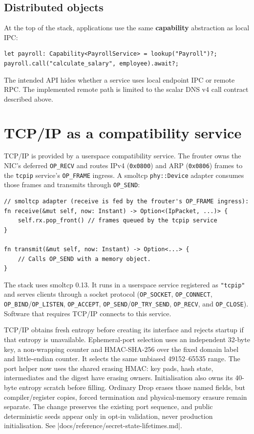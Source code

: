 \subsection{Distributed objects}

At the top of the stack, applications use the same \textbf{capability}
abstraction as local IPC:

\begin{lstlisting}[style=rustCode]
let payroll: Capability<PayrollService> = lookup("Payroll")?;
payroll.call("calculate_salary", employee).await?;
\end{lstlisting}

The intended API hides whether a service uses local endpoint IPC or remote RPC.
The implemented remote path is limited to the scalar DNS v4 call contract
described above.

\section{TCP/IP as a compatibility service}

TCP/IP is provided by a userspace compatibility service. The frouter owns the
NIC's deferred \texttt{OP\_RECV} and routes IPv4 (\texttt{0x0800}) and ARP
(\texttt{0x0806}) frames to the \texttt{tcpip} service's \texttt{OP\_FRAME}
ingress. A smoltcp \texttt{phy::Device} adapter consumes those frames and
transmits through \texttt{OP\_SEND}:

\begin{lstlisting}[style=rustCode]
// smoltcp adapter (receive is fed by the frouter's OP_FRAME ingress):
fn receive(&mut self, now: Instant) -> Option<(IpPacket, ...)> {
    self.rx.pop_front() // frames queued by the tcpip service
}

fn transmit(&mut self, now: Instant) -> Option<...> {
    // Calls OP_SEND with a memory object.
}
\end{lstlisting}

The stack uses smoltcp 0.13. It runs in a userspace service registered as
\texttt{"tcpip"} and serves clients through a socket protocol
(\texttt{OP\_SOCKET}, \texttt{OP\_CONNECT},
\texttt{OP\_BIND}/\texttt{OP\_LISTEN}, \texttt{OP\_ACCEPT}, \texttt{OP\_SEND}/\texttt{OP\_TRY\_SEND},
\texttt{OP\_RECV}, and \texttt{OP\_CLOSE}). Software that requires
TCP/IP connects to this service.

TCP/IP obtains fresh entropy before creating its interface and rejects startup
if that entropy is unavailable. Ephemeral-port selection uses an independent
32-byte key, a non-wrapping counter and HMAC-SHA-256 over the fixed domain label
and little-endian counter. It selects the same unbiased 49152--65535 range.
The port helper now uses the shared erasing HMAC: key pads, hash state,
intermediates and the digest have erasing owners. Initialisation also owns its
40-byte entropy scratch before filling. Ordinary Drop erases those named fields, but
compiler/register copies, forced termination and physical-memory erasure remain
separate. The change preserves the existing port sequence, and public deterministic
seeds appear only in opt-in validation, never production initialisation. See
\repofile|docs/reference/secret-state-lifetimes.md|.

